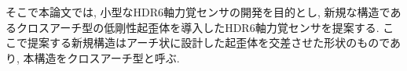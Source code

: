 そこで本論文では, 小型なHDR6軸力覚センサの開発を目的とし, 
新規な構造であるクロスアーチ型の低剛性起歪体を導入したHDR6軸力覚センサを提案する. 
ここで提案する新規構造はアーチ状に設計した起歪体を交差させた形状のものであり, 
本構造をクロスアーチ型と呼ぶ. 

